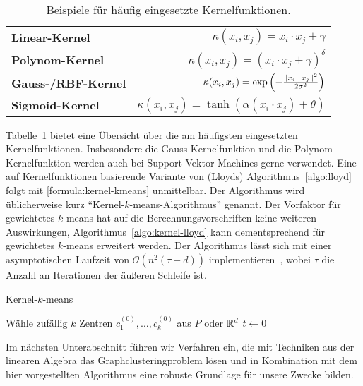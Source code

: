 \begin{table}[t]
\centering
\begin{tabular}{@{}lr@{}} \toprule
	\textbf{Linear-Kernel} & $\kappa(x_i, x_j) = x_i \cdot x_j + \gamma $ \\
	\textbf{Polynom-Kernel} & $\kappa(x_i, x_j) = \left( x_i \cdot x_j + \gamma \right)^\delta$ \\
	\textbf{Gauss-/RBF-Kernel} & $\kappa(x_i, x_j) = \exp \left( - \frac{\lVert {x_i} - {x_j} \rVert^2}{2 \sigma^2} \right)$ \\
	\textbf{Sigmoid-Kernel} & $\kappa(x_i, x_j) = \tanh(\alpha(x_i \cdot x_j) + \theta) $ \\ \bottomrule
\end{tabular}
\caption{Beispiele für häufig eingesetzte Kernelfunktionen.}
\label{tbl:kernel-functions}
\end{table}
Tabelle~\ref{tbl:kernel-functions} bietet eine Übersicht über die am häufigsten eingesetzten Kernelfunktionen. Insbesondere
die Gauss-Kernelfunktion und die Polynom-Kernelfunktion werden auch bei Support-Vektor-Machines gerne verwendet.
\absatz
Eine auf Kernelfunktionen basierende Variante von (Lloyds) Algorithmus~\ref{algo:lloyd} folgt mit \ref{formula:kernel-kmeans}
unmittelbar. Der Algorithmus wird üblicherweise kurz "`Kernel-$k$-means-Algorithmus"' genannt.
Der Vorfaktor für gewichtetes $k$-means hat auf die Berechnungsvorschriften keine weiteren Auswirkungen,
Algorithmus~\ref{algo:kernel-lloyd} kann dementsprechend für gewichtetes $k$-means erweitert werden. Der Algorithmus
lässt sich mit einer asymptotischen Laufzeit von $\mathcal{O}(n^2 (\tau + d))$ implementieren~\cite{DhillonGK04,DhillonGK07},
wobei $\tau$ die Anzahl an Iterationen der äußeren Schleife ist.
\absatz
\begin{algorithm}[]
\label{algo:kernel-lloyd}
\caption{Kernel-$k$-means}
	\DontPrintSemicolon
	
	\BlankLine
	
	Wähle zufällig $k$ Zentren $c_1^{(0)}, \dots, c_k^{(0)}$ aus $P$ oder $\mathbb{R}^{d}$\;
	$t \leftarrow 0$\;
\end{algorithm}
Im nächsten Unterabschnitt führen wir Verfahren ein, die mit Techniken aus der linearen Algebra das Graphclusteringproblem
lösen und in Kombination mit dem hier vorgestellten Algorithmus eine robuste Grundlage für unsere Zwecke bilden.

